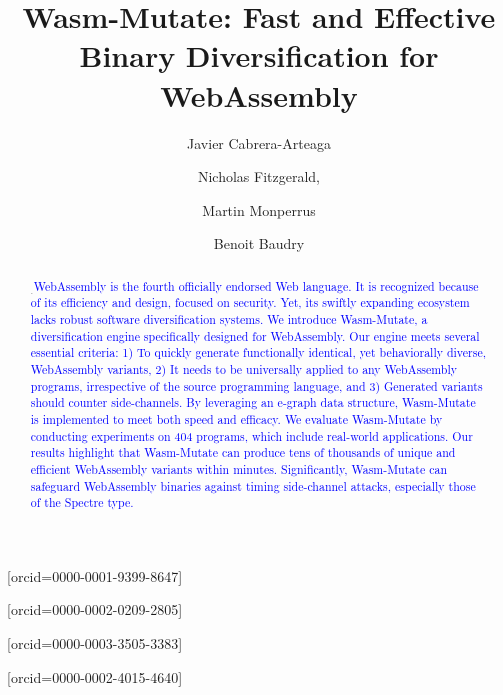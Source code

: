 \documentclass[a4paper,fleqn]{cas-dc}
\newcommand*\badge[1]{ \colorbox{red}{\color{white}#1}}
\newcommand{\tool}{{\sc Wasm-Mutate}\xspace}
\newcommand{\Wasm}{WebAssembly\xspace}
\newcommand{\wasm}{\Wasm}
\newcommand{\todo}[1]{%
\refstepcounter{todo}
\noindent\textbf{\badge{TODO}} {\color{red}#1}
\addcontentsline{td}{todo}
{\color{red}\thesection.\thetodo\xspace #1}}
\begin{document}
\sloppy



\newcommand\mytitle{\tool: Fast and Effective Binary Diversification for WebAssembly}
\shorttitle{}

\title [mode = title]{\mytitle}

\author[kth-address]{Javier Cabrera-Arteaga}[orcid=0000-0001-9399-8647]\cormark[1]
\author[fastly-address]{Nicholas Fitzgerald,}[orcid=0000-0002-0209-2805]
\author[kth-address]{Martin Monperrus}[orcid=0000-0003-3505-3383]
\author[kth-address]{Benoit Baudry}[orcid=0000-0002-4015-4640]

\address[kth-address]{KTH Royal Institute of Technology, Stockholm, Sweden}
\address[fastly-address]{Fastly Inc., San Francisco, USA }





\begin{abstract}
    $_.$\textcolor{blue}{WebAssembly is the fourth officially endorsed Web language.
    It is recognized because of its efficiency and design, focused on security. 
    Yet, its swiftly expanding ecosystem lacks robust software diversification systems. 
    We introduce \tool, a diversification engine specifically designed for WebAssembly. 
    Our engine meets several essential criteria: 
    1) To quickly generate functionally identical, yet behaviorally diverse, WebAssembly variants, 
    2) It needs to be universally applied to any WebAssembly programs, irrespective of the source programming language, and 
    3) Generated variants should counter side-channels. 
    By leveraging an e-graph data structure, \tool is implemented to meet both speed and efficacy.
    We evaluate \tool by conducting experiments on 404 programs, which include real-world applications.
    Our results highlight that \tool can produce tens of thousands of unique and efficient WebAssembly variants within minutes.
    Significantly, \tool can safeguard \wasm binaries against timing side-channel attacks, especially those of the Spectre type.}
\end{abstract}
\end{document}
